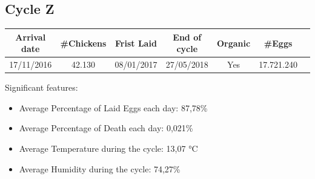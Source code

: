 \documentclass[11pt]{article}
\begin{document}
\subsection{Cycle Z}
\begin{center}
    \begin{tabular}{| c | c | c | c | c | c | c |} 
        \hline
        Arrival date & \#Chickens & Frist Laid & End of cycle & Organic & \#Eggs\\ [0.5ex] 
        \hline
        17/11/2016 & 42.130 & 08/01/2017 & 27/05/2018 & Yes & 17.721.240\\ 
        \hline
    \end{tabular}
\end{center}

Significant features:
\begin{itemize}
    \item Average Percentage of Laid Eggs each day: 87,78\%
    \item Average Percentage of Death each day: 0,021\%
    \item Average Temperature during the cycle: 13,07 °C
    \item Average Humidity during the cycle: 74,27\%
\end{itemize}
\end{document}
